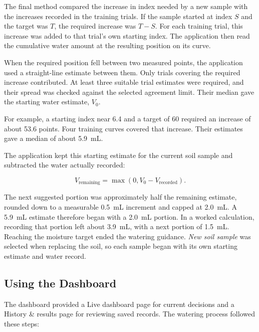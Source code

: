 \documentclass[11pt,a4paper]{article}
\begin{document}
The final method compared the increase in index needed by a new sample with the increases recorded in the training trials. If the sample started at index $S$ and the target was $T$, the required increase was $T-S$. For each training trial, this increase was added to that trial's own starting index. The application then read the cumulative water amount at the resulting position on its curve.

When the required position fell between two measured points, the application used a straight-line estimate between them. Only trials covering the required increase contributed. At least three suitable trial estimates were required, and their spread was checked against the selected agreement limit. Their median gave the starting water estimate, $V_0$.

For example, a starting index near 6.4 and a target of 60 required an increase of about 53.6 points. Four training curves covered that increase. Their estimates gave a median of about 5.9~mL.

The application kept this starting estimate for the current soil sample and subtracted the water actually recorded:

\begin{equation}
V_{\mathrm{remaining}}=\max\left(0,V_0-V_{\mathrm{recorded}}\right).
\label{eq:remaining}
\end{equation}

The next suggested portion was approximately half the remaining estimate, rounded down to a measurable 0.5~mL increment and capped at 2.0~mL. A 5.9~mL estimate therefore began with a 2.0~mL portion. In a worked calculation, recording that portion left about 3.9~mL, with a next portion of 1.5~mL. Reaching the moisture target ended the watering guidance. \emph{New soil sample} was selected when replacing the soil, so each sample began with its own starting estimate and water record.

\subsection{Using the Dashboard}

The dashboard provided a Live dashboard page for current decisions and a History \& results page for reviewing saved records. The watering process followed these steps:
\end{document}
